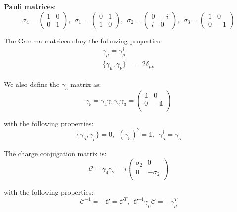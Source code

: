 \begin{appendix}
\noindent
\textbf{Pauli matrices}:
\[\sigma_4=\left( \begin{array}{cc}
1 & 0 \\
0 & 1 \end{array} \right),~~
\sigma_1=\left( \begin{array}{cc} 0 & 1\\ 1 & 0 \end{array} \right),~~
\sigma_2=\left( \begin{array}{cc} 0 & -i\\ i & 0 \end{array} \right),~~
\sigma_3=\left( \begin{array}{cc} 1 & 0 \\ 0 & -1 \end{array} \right)\]


\noindent
The Gamma matrices obey the following properties:
\begin{eqnarray}
 \gamma_\mu=\gamma_\mu^\dagger\\
  \{\gamma_\mu,\gamma_\nu\}&=&2\delta_{\mu\nu}
\end{eqnarray}

\noindent
We also define the $\gamma_5$ matrix as:
\[\gamma_5=\gamma_4\gamma_1\gamma_2\gamma_3=\left(\begin{array}{cc}
                                                   \mathbb{1} & 0\\
                                                   0 & -\mathbb{1}\\
                                                  \end{array}\right)\]

\noindent
with the following properties:
\begin{equation}
 \{\gamma_5,\gamma_\mu\}=0,~~(\gamma_5)^2=\mathbb{1},~~\gamma_5^\dagger=\gamma_5
\end{equation}


\noindent
The charge conjugation matrix is:
\begin{equation}
\label{Cmtrx}
\mathcal{C}=\gamma_4\gamma_2=i\left(\begin{array}{cc} \sigma_2 & 0 \\ 0 & -\sigma_2\\ \end{array}\right)
\end{equation}

\noindent
with the following properties:
\begin{equation}
 \mathcal{C}^{-1}=-\mathcal{C}=\mathcal{C}^T,~~\mathcal{C}^{-1}\gamma_\mu\mathcal{C}=-
\gamma_\mu^T
\end{equation}


\end{appendix}
